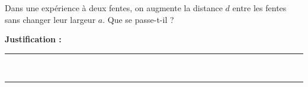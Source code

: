 Dans une expérience à deux fentes, on augmente la distance $d$ entre les fentes sans changer leur largeur $a$. Que se passe-t-il ?

\choices

\noindent\textbf{Justification :} \hrulefill \\[2.5ex]
\rule{\linewidth}{0.4pt} \\[2.5ex]
\rule{\linewidth}{0.4pt}
\vfill
